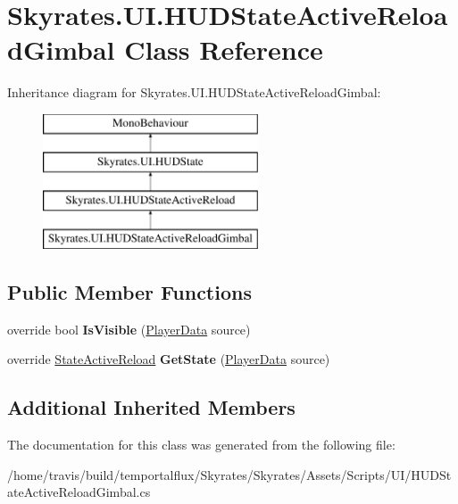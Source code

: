 \hypertarget{class_skyrates_1_1_u_i_1_1_h_u_d_state_active_reload_gimbal}{\section{Skyrates.\-U\-I.\-H\-U\-D\-State\-Active\-Reload\-Gimbal Class Reference}
\label{class_skyrates_1_1_u_i_1_1_h_u_d_state_active_reload_gimbal}
}
Inheritance diagram for Skyrates.\-U\-I.\-H\-U\-D\-State\-Active\-Reload\-Gimbal\-:\begin{figure}[H]
\begin{center}
\leavevmode
\includegraphics[height=4.000000cm]{class_skyrates_1_1_u_i_1_1_h_u_d_state_active_reload_gimbal}
\end{center}
\end{figure}
\subsection*{Public Member Functions}
\begin{DoxyCompactItemize}
\item 
\hypertarget{class_skyrates_1_1_u_i_1_1_h_u_d_state_active_reload_gimbal_a0ebc06cf8a79c2bd5ce17a685b6b6013}{override bool {\bfseries Is\-Visible} (\hyperlink{class_skyrates_1_1_data_1_1_player_data}{Player\-Data} source)}\label{class_skyrates_1_1_u_i_1_1_h_u_d_state_active_reload_gimbal_a0ebc06cf8a79c2bd5ce17a685b6b6013}

\item 
\hypertarget{class_skyrates_1_1_u_i_1_1_h_u_d_state_active_reload_gimbal_a7e2aedb12541f0c72638c52185f1622d}{override \hyperlink{class_skyrates_1_1_misc_1_1_state_active_reload}{State\-Active\-Reload} {\bfseries Get\-State} (\hyperlink{class_skyrates_1_1_data_1_1_player_data}{Player\-Data} source)}\label{class_skyrates_1_1_u_i_1_1_h_u_d_state_active_reload_gimbal_a7e2aedb12541f0c72638c52185f1622d}

\end{DoxyCompactItemize}
\subsection*{Additional Inherited Members}


The documentation for this class was generated from the following file\-:\begin{DoxyCompactItemize}
\item 
/home/travis/build/temportalflux/\-Skyrates/\-Skyrates/\-Assets/\-Scripts/\-U\-I/H\-U\-D\-State\-Active\-Reload\-Gimbal.\-cs\end{DoxyCompactItemize}
